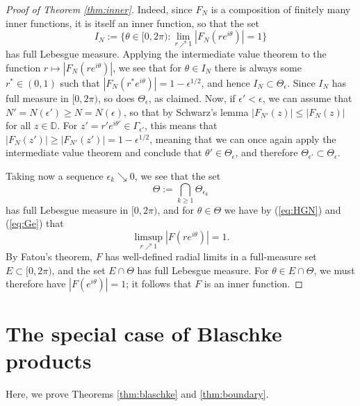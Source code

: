 \documentclass[a4paper,11pt]{article}
\theoremstyle{plain}
\theoremstyle{definition}
\theoremstyle{definition}
\begin{document}
\begin{proof}[Proof of Theorem \ref{thm:inner}]
Indeed, since $F_N$ is a composition of finitely many inner functions, it is itself an inner function, so that the set
\[ I_N := \{\theta\in[0, 2\pi) : \lim_{r\nearrow 1} |F_N(re^{i\theta})| = 1\} \]
has full Lebesgue measure. Applying the intermediate value theorem to the function $r\mapsto |F_N(re^{i\theta})|$, we see that for $\theta\in I_N$ there is always some $r^*\in (0, 1)$ such that $|F_N(r^*e^{i\theta})| = 1 - \epsilon^{1/2}$, and hence $I_N\subset \Theta_\epsilon$. Since $I_N$ has full measure in $[0, 2\pi)$, so does $\Theta_\epsilon$, as claimed. Now, if $\epsilon' < \epsilon$, we can assume that $N' = N(\epsilon') \geq N = N(\epsilon)$, so that by Schwarz's lemma $|F_{N'}(z)| \leq |F_N(z)|$ for all $z\in\mathbb{D}$. For $z' = r'e^{i\theta'}\in\Gamma_{\epsilon'}$, this means that $|F_N(z')| \geq |F_{N'}(z')| = 1 - \epsilon^{1/2}$, meaning that we can once again apply the intermediate value theorem and conclude that $\theta'\in \Theta_\epsilon$, and therefore $\Theta_{\epsilon'}\subset \Theta_\epsilon$.

Taking now a sequence $\epsilon_k \searrow 0$, we see that the set
\[ \Theta := \bigcap_{k\geq 1} \Theta_{\epsilon_k} \]
has full Lebesgue measure in $[0, 2\pi)$, and for $\theta\in\Theta$ we have by (\ref{eq:HGN}) and (\ref{eq:Ge}) that
\[ \limsup_{r\nearrow 1} |F(re^{i\theta})| = 1. \]
By Fatou's theorem, $F$ has well-defined radial limits in a full-measure set $E\subset [0, 2\pi)$, and the set $E\cap\Theta$ has full Lebesgue measure. For $\theta\in E\cap\Theta$, we must therefore have $|F(e^{i\theta})| = 1$; it follows that $F$ is an inner function.
\end{proof}

\section{The special case of Blaschke products}
Here, we prove Theorems \ref{thm:blaschke} and \ref{thm:boundary}.
\end{document}
